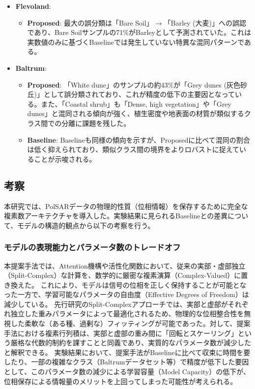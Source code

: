 \begin{itemize}
    \item \textbf{Flevoland}:
    \begin{itemize}
        \item \textbf{Proposed}: 最大の誤分類は「Bare Soil」$\to$「Barley (大麦)」への誤認であり、Bare Soilサンプルの71\%がBarleyとして予測されていた。これは実数値のみに基づくBaselineでは発生していない特異な混同パターンである。
    \end{itemize}
    \item \textbf{Baltrum}:
    \begin{itemize}
        \item \textbf{Proposed}: 「White dune」のサンプルの約43\%が「Grey dunes (灰色砂丘)」として誤分類されており、これが精度の低下の主要因となっている。また、「Coastal shrub」も「Dense, high vegetation」や「Grey dunes」と混同される傾向が強く、植生密度や地表面の材質が類似するクラス間での分離に課題を残した。
        \item \textbf{Baseline}: Baselineも同様の傾向を示すが、Proposedに比べて混同の割合は低く抑えられており、類似クラス間の境界をよりロバストに捉えていることが示唆される。
    \end{itemize}
\end{itemize}





\subsection{考察}
本研究では、PolSARデータの物理的性質（位相情報）を保存するために完全な複素数アーキテクチャを導入した。実験結果に見られるBaselineとの差異について、モデルの構造的観点から以下の考察を行う。

\subsubsection{モデルの表現能力とパラメータ数のトレードオフ}
本提案手法では、Attention機構や活性化関数において、従来の実部・虚部独立（Split-Complex）な計算を、数学的に厳密な複素演算（Complex-Valued）に置き換えた。
これにより、モデルは信号の位相を正しく保持することが可能となった一方で、学習可能なパラメータの自由度（Effective Degrees of Freedom）は減少している。
先行研究のSplit-Complexアプローチでは、実部と虚部がそれぞれ独立した重みパラメータによって最適化されるため、物理的な位相整合性を無視した柔軟な（ある種、過剰な）フィッティングが可能であった。対して、提案手法における複素行列積は、実部と虚部の重み間に「回転とスケーリング」という厳格な代数的制約を課すことと同義であり、実質的なパラメータ数が減少したと解釈できる。
実験結果において、提案手法がBaselineに比べて収束に時間を要したり、一部の複雑なクラス（Baltrumデータセット等）で精度が低下した要因として、このパラメータ数の減少による学習容量（Model Capacity）の低下が、位相保存による情報量のメリットを上回ってしまった可能性が考えられる。

